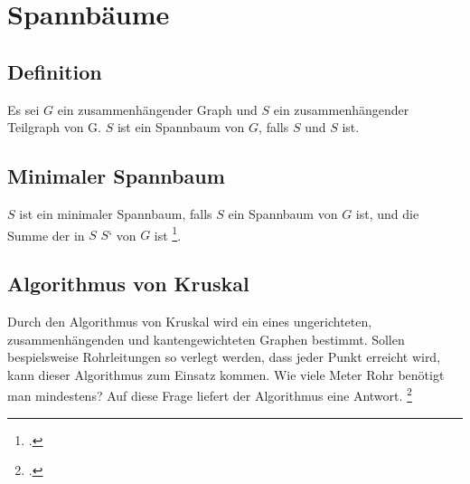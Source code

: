 \documentclass{lehramt-informatik}
\begin{document}

\chapter{Spannbäume}

%

\section{Definition}

Es sei $G$ ein zusammenhängender Graph und $S$ ein zusammenhängender
Teilgraph von G. $S$ ist ein Spannbaum von $G$, falls $S$  und $S$  ist.

%

\section{Minimaler Spannbaum}

$S$ ist ein minimaler Spannbaum, falls $S$ ein Spannbaum von $G$ ist,
und die Summe der  in $S$  $S‘$ von $G$ ist
\footcite[Seite 29 (PDF 23)]{aud:fs:6}.

%

\section{Algorithmus von Kruskal}

Durch den Algorithmus von Kruskal wird ein 
eines ungerichteten, zusammenhängenden und kantengewichteten Graphen
bestimmt. Sollen bespielsweise Rohrleitungen so verlegt werden, dass
jeder Punkt erreicht wird, kann dieser Algorithmus zum Einsatz kommen.
Wie viele Meter Rohr benötigt man mindestens? Auf diese Frage liefert
der Algorithmus eine Antwort.
\footcite[Seite 30 (PDF 24)]{aud:fs:6}
\end{document}
